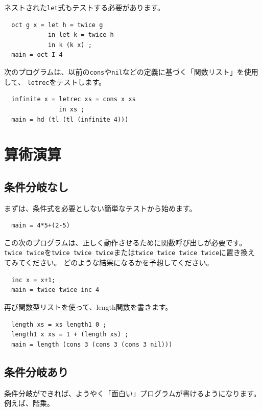 \documentclass{jbook}
\begin{document}
ネストされた\texttt{let}式もテストする必要があります。

\begin{verbatim}
  oct g x = let h = twice g
            in let k = twice h
            in k (k x) ;
  main = oct I 4
\end{verbatim}

次のプログラムは、以前の\texttt{cons}や\texttt{nil}などの定義に基づく「関数リスト」を使用して、
\texttt{letrec}をテストします。

\begin{verbatim}
  infinite x = letrec xs = cons x xs
               in xs ;
  main = hd (tl (tl (infinite 4)))
\end{verbatim}
\newpage

\section{算術演算}

\subsection{条件分岐なし}

まずは、条件式を必要としない簡単なテストから始めます。

\begin{verbatim}
  main = 4*5+(2-5)
\end{verbatim}

この次のプログラムは、正しく動作させるために関数呼び出しが必要です。
\texttt{twice twice}を\texttt{twice twice twice}または\texttt{twice twice twice twice}に置き換えてみてください。
どのような結果になるかを予想してください。

\begin{verbatim}
  inc x = x+1;
  main = twice twice inc 4
\end{verbatim}

再び関数型リストを使って、length関数を書きます。

\begin{verbatim}
  length xs = xs length1 0 ;
  length1 x xs = 1 + (length xs) ;
  main = length (cons 3 (cons 3 (cons 3 nil)))
\end{verbatim}

\subsection{条件分岐あり}

条件分岐ができれば、ようやく「面白い」プログラムが書けるようになります。
例えば、階乗。
\end{document}
